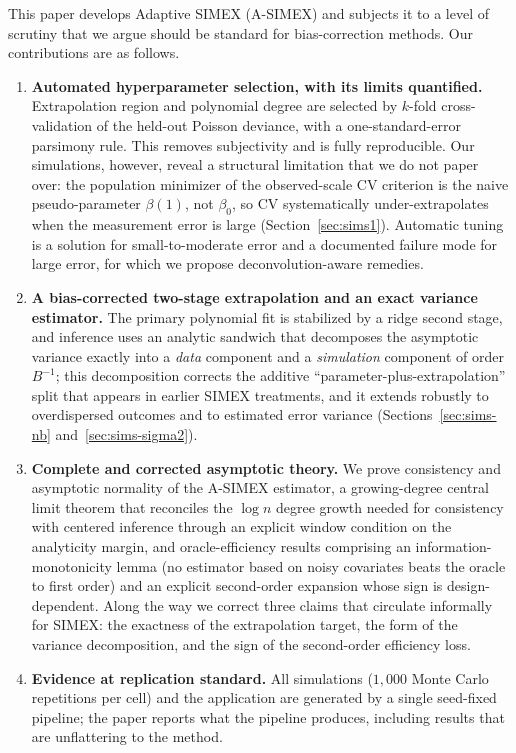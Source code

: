 \documentclass[3p,11pt]{elsarticle}
\theoremstyle{plain}
\theoremstyle{definition}
\begin{document}
This paper develops Adaptive SIMEX (A-SIMEX) and subjects it to a
level of scrutiny that we argue should be standard for
bias-correction methods. Our contributions are as follows.

\begin{enumerate}\itemsep3pt
\item \textbf{Automated hyperparameter selection, with its limits
      quantified.} Extrapolation region and polynomial degree are
      selected by $k$-fold cross-validation of the held-out Poisson
      deviance, with a one-standard-error parsimony rule. This removes
      subjectivity and is fully reproducible. Our simulations,
      however, reveal a structural limitation that we do not paper
      over: the population minimizer of the observed-scale CV criterion
      is the naive pseudo-parameter $\beta(1)$, not $\beta_0$, so CV
      systematically under-extrapolates when the measurement error is
      large (Section~\ref{sec:sims1}). Automatic tuning is a solution
      for small-to-moderate error and a documented failure mode for
      large error, for which we propose deconvolution-aware remedies.
\item \textbf{A bias-corrected two-stage extrapolation and an exact
      variance estimator.} The primary polynomial fit is stabilized by
      a ridge second stage, and inference uses an analytic sandwich
      that decomposes the asymptotic variance exactly into a
      \emph{data} component and a \emph{simulation} component of order
      $B^{-1}$; this decomposition corrects the additive
      ``parameter-plus-extrapolation'' split that appears in earlier
      SIMEX treatments, and it extends robustly to overdispersed
      outcomes and to estimated error variance
      (Sections~\ref{sec:sims-nb} and~\ref{sec:sims-sigma2}).
\item \textbf{Complete and corrected asymptotic theory.} We prove
      consistency and asymptotic normality of the A-SIMEX estimator, a
      growing-degree central limit theorem that reconciles the
      $\log n$ degree growth needed for consistency with centered
      inference through an explicit window condition on the
      analyticity margin, and oracle-efficiency results comprising an
      information-monotonicity lemma (no estimator based on noisy
      covariates beats the oracle to first order) and an explicit
      second-order expansion whose sign is design-dependent. Along the
      way we correct three claims that circulate informally for SIMEX:
      the exactness of the extrapolation target, the form of the
      variance decomposition, and the sign of the second-order
      efficiency loss.
\item \textbf{Evidence at replication standard.} All simulations
      ($1{,}000$ Monte Carlo repetitions per cell) and the application
      are generated by a single seed-fixed pipeline; the paper reports
      what the pipeline produces, including results that are
      unflattering to the method.
\end{enumerate}
\end{document}
